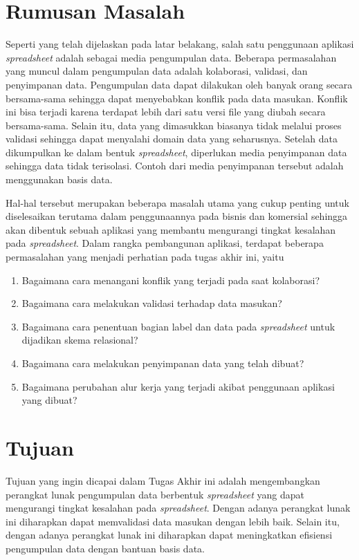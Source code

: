 \section{Rumusan Masalah}

Seperti yang telah dijelaskan pada latar belakang, salah satu penggunaan aplikasi \textit{spreadsheet} adalah sebagai media pengumpulan data. Beberapa permasalahan yang muncul dalam pengumpulan data adalah kolaborasi, validasi, dan penyimpanan data. Pengumpulan data dapat dilakukan oleh banyak orang secara bersama-sama sehingga dapat menyebabkan konflik pada data masukan. Konflik ini bisa terjadi karena terdapat lebih dari satu versi file yang diubah secara bersama-sama. Selain itu, data yang dimasukkan biasanya tidak melalui proses validasi sehingga dapat menyalahi domain data yang seharusnya. Setelah data dikumpulkan ke dalam bentuk \textit{spreadsheet}, diperlukan media penyimpanan data sehingga data tidak terisolasi. Contoh dari media penyimpanan tersebut adalah menggunakan basis data. 

Hal-hal tersebut merupakan beberapa masalah utama yang cukup penting untuk diselesaikan terutama dalam penggunaannya pada bisnis dan komersial sehingga akan dibentuk sebuah aplikasi yang membantu mengurangi tingkat kesalahan pada \textit{spreadsheet}. Dalam rangka pembangunan aplikasi, terdapat beberapa permasalahan yang menjadi perhatian pada tugas akhir ini, yaitu

\begin{enumerate}
    \item Bagaimana cara menangani konflik yang terjadi pada saat kolaborasi?
    \item Bagaimana cara melakukan validasi terhadap data masukan?
    \item Bagaimana cara penentuan bagian label dan data pada \textit{spreadsheet} untuk dijadikan skema relasional?
    \item Bagaimana cara melakukan penyimpanan data yang telah dibuat?
    \item Bagaimana perubahan alur kerja yang terjadi akibat penggunaan aplikasi yang dibuat?
\end{enumerate}

\section{Tujuan}

Tujuan yang ingin dicapai dalam Tugas Akhir ini adalah mengembangkan perangkat lunak pengumpulan data berbentuk \textit{spreadsheet} yang dapat mengurangi tingkat kesalahan pada \textit{spreadsheet}. Dengan adanya perangkat lunak ini diharapkan dapat memvalidasi data masukan dengan lebih baik. Selain itu, dengan adanya perangkat lunak ini diharapkan dapat meningkatkan efisiensi pengumpulan data dengan bantuan basis data.

